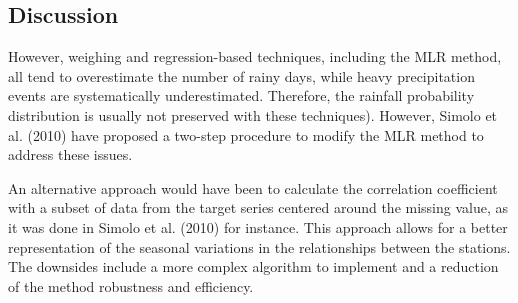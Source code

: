 \documentclass[TechnicalNoteMeteo.tex]{subfiles}
\begin{document}




\subsection{Discussion}

However, weighing and regression-based techniques, including the MLR method, all tend to overestimate the number of rainy days, while heavy precipitation events are systematically underestimated. Therefore, the rainfall probability distribution is usually not preserved with these techniques). However, Simolo et al. (2010) have proposed a two-step procedure to modify the MLR method to address these issues.

An alternative approach would have been to calculate the correlation coefficient with a subset of data from the target series centered around the missing value, as it was done in Simolo et al. (2010) for instance. This approach allows for a better representation of the seasonal variations in the relationships between the stations. The downsides include a more complex algorithm to implement and a reduction of the method robustness and efficiency.
\end{document}
